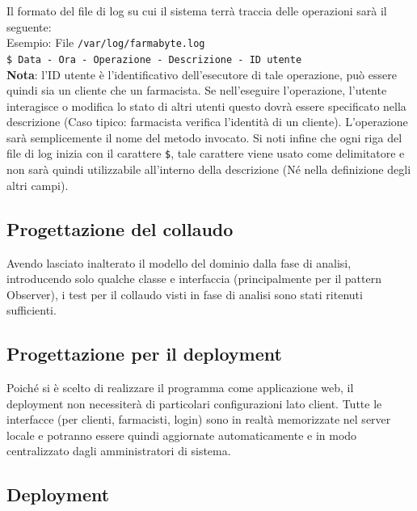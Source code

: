 Il formato del file di log su cui il sistema terrà traccia delle operazioni
sarà il seguente:\\

Esempio: File \texttt{/var/log/farmabyte.log}\\

\texttt{\$ Data - Ora - Operazione - Descrizione - ID utente}\\
\textbf{Nota}: l'ID utente è l'identificativo dell'esecutore di tale operazione, può essere quindi sia un cliente che un farmacista.
Se nell'eseguire l'operazione, l'utente interagisce o modifica lo stato di altri utenti questo dovrà essere specificato nella descrizione (Caso tipico: farmacista verifica l'identità di un cliente).
L'operazione sarà semplicemente il nome del metodo invocato. 
Si noti infine che ogni riga del file di log inizia con il carattere \texttt{\$}, tale carattere viene usato come delimitatore e non sarà quindi utilizzabile all'interno della descrizione (Né nella definizione degli altri campi).

\newpage

\subsection{Progettazione del collaudo}

Avendo lasciato inalterato il modello del dominio dalla fase di analisi, introducendo solo qualche classe e interfaccia (principalmente per il pattern Observer), 
i test per il collaudo visti in fase di analisi sono stati ritenuti sufficienti.

\vspace{2em}

\subsection{Progettazione per il deployment}

Poiché si è scelto di realizzare il programma come applicazione web, il deployment non necessiterà di particolari configurazioni lato client.
Tutte le interfacce (per clienti, farmacisti, login) sono in realtà memorizzate nel server locale e potranno essere quindi aggiornate automaticamente e in modo centralizzato dagli amministratori di sistema. 

\newpage

\subsection{Deployment}

